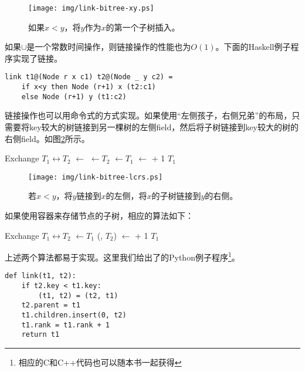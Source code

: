 \documentclass[UTF8]{article}
\begin{document}
\begin{figure}[htbp]
  \centering
  \texttt{[image: img/link-bitree-xy.ps]}
  \caption{如果$x < y$，将$y$作为$x$的第一个子树插入。} \label{fig:link-xy}
\end{figure}

如果$\cup$是一个常数时间操作，则链接操作的性能也为$O(1)$。下面的Haskell例子程序实现了链接。

\lstset{language=Haskell}
\begin{lstlisting}
link t1@(Node r x c1) t2@(Node _ y c2) =
    if x<y then Node (r+1) x (t2:c1)
    else Node (r+1) y (t1:c2)
\end{lstlisting}

链接操作也可以用命令式的方式实现。如果使用“左侧孩子，右侧兄弟”的布局，只需要将key较大的树链接到另一棵树的左侧field，然后将子树链接到key较大的树的右侧field。如图\ref{fig:link-lcrs}所示。

\begin{algorithmic}[1]
    \State Exchange $T_1 \leftrightarrow T_2$
  \EndIf
  \State {} $\gets$ 
  \State {} $\gets T_2$
  \State {} $\gets T_1$
  \State {} $\gets$  + 1
  \State \Return $T_1$
\EndFunction
\end{algorithmic}

\begin{figure}[htbp]
  \centering
  \texttt{[image: img/link-bitree-lcrs.ps]}
  \caption{若$x < y$，将$y$链接到$x$的左侧，将$x$的子树链接到$y$的右侧。} \label{fig:link-lcrs}
\end{figure}

如果使用容器来存储节点的子树，相应的算法如下：

\begin{algorithmic}[1]
    \State Exchange $T_1 \leftrightarrow T_2$
  \EndIf
  \State {} $\gets T_1$
  \State {}(, $T_2$)
  \State {} $\gets$  + 1
  \State \Return $T_1$
\EndFunction
\end{algorithmic}

上述两个算法都易于实现。这里我们给出了的Python例子程序\footnote{相应的C和C++代码也可以随本书一起获得}。

\lstset{language=Python}
\begin{lstlisting}
def link(t1, t2):
    if t2.key < t1.key:
        (t1, t2) = (t2, t1)
    t2.parent = t1
    t1.children.insert(0, t2)
    t1.rank = t1.rank + 1
    return t1
\end{lstlisting}
\end{document}
